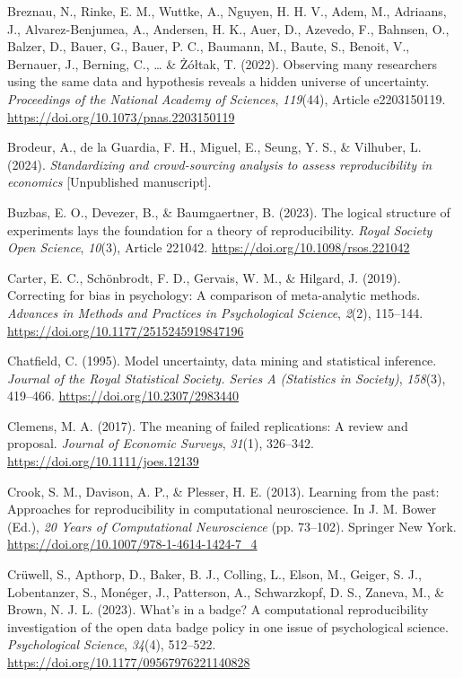 \documentclass[authordate, meta]{jote-new-article}
\begin{document}
	Breznau, N., Rinke, E. M., Wuttke, A., Nguyen, H. H. V., Adem, M., Adriaans, J., Alvarez-Benjumea, A., Andersen, H. K., Auer, D., Azevedo, F., Bahnsen, O., Balzer, D., Bauer, G., Bauer, P. C., Baumann, M., Baute, S., Benoit, V., Bernauer, J., Berning, C., … \& Żółtak, T. (2022). Observing many researchers using the same data and hypothesis reveals a hidden universe of uncertainty. \emph{Proceedings of the National Academy of Sciences}, \emph{119}(44), Article e2203150119. \url{https://doi.org/10.1073/pnas.2203150119}


	Brodeur, A., de la Guardia, F. H., Miguel, E., Seung, Y. S., \& Vilhuber, L. (2024). \emph{Standardizing and crowd-sourcing analysis to assess reproducibility in economics} [Unpublished manuscript].


	Buzbas, E. O., Devezer, B., \& Baumgaertner, B. (2023). The logical structure of experiments lays the foundation for a theory of reproducibility. \emph{Royal Society Open Science}, \emph{10}(3), Article 221042. \url{https://doi.org/10.1098/rsos.221042}


	Carter, E. C., Schönbrodt, F. D., Gervais, W. M., \& Hilgard, J. (2019). Correcting for bias in psychology: A comparison of meta-analytic methods. \emph{Advances in Methods and Practices in Psychological Science}, \emph{2}(2), 115--144. \url{https://doi.org/10.1177/2515245919847196}


	Chatfield, C. (1995). Model uncertainty, data mining and statistical inference. \emph{Journal of the Royal Statistical Society. Series A (Statistics in Society)}, \emph{158}(3), 419--466. \url{https://doi.org/10.2307/2983440}


	Clemens, M. A. (2017). The meaning of failed replications: A review and proposal. \emph{Journal of Economic Surveys}, \emph{31}(1), 326--342. \url{https://doi.org/10.1111/joes.12139}


	Crook, S. M., Davison, A. P., \& Plesser, H. E. (2013). Learning from the past: Approaches for reproducibility in computational neuroscience. In J. M. Bower (Ed.), \emph{20 Years of Computational Neuroscience} (pp. 73--102). Springer New York. \url{https://doi.org/10.1007/978-1-4614-1424-7\_4}


	Crüwell, S., Apthorp, D., Baker, B. J., Colling, L., Elson, M., Geiger, S. J., Lobentanzer, S., Monéger, J., Patterson, A., Schwarzkopf, D. S., Zaneva, M., \& Brown, N. J. L. (2023). What's in a badge? A computational reproducibility investigation of the open data badge policy in one issue of psychological science. \emph{Psychological Science}, \emph{34}(4), 512--522. \url{https://doi.org/10.1177/09567976221140828}
\end{document}
